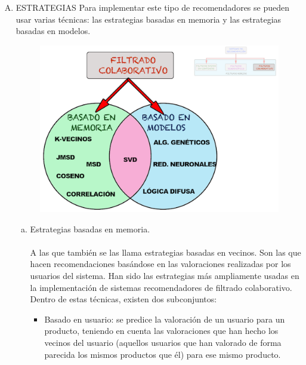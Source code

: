\documentclass[11pt,a4paper]{article}
\begin{document}
		 	\begin{enumerate}[A.]
		 		\item ESTRATEGIAS
		 		Para implementar este tipo de recomendadores se pueden usar varias técnicas: las estrategias basadas en memoria y las estrategias basadas en modelos. 
		 		
		 		\begin{figure}[H]
		 			\begin{center}
		 				\includegraphics[scale=0.9]{./Imagenes/img02}		
		 			\end{center}
		 		\end{figure}
	 			
	 			\begin{enumerate}[a.]
	 				\item Estrategias basadas en memoria.\\
	 				\\
	 				A las que también se las llama estrategias basadas en vecinos. Son las que hacen recomendaciones basándose en las valoraciones realizadas por los usuarios del sistema. Han sido las estrategias más ampliamente usadas en la implementación de sistemas recomendadores de filtrado colaborativo. Dentro de estas técnicas, existen dos subconjuntos: 
	 				
	 				\begin{itemize}
	 					\item Basado en usuario: se predice la valoración de un usuario para un producto, teniendo en cuenta las valoraciones que han hecho los vecinos del usuario (aquellos usuarios que han valorado de forma parecida los mismos productos que él) para ese mismo producto. \\


\end{itemize}
\end{enumerate}
\end{enumerate}
\end{document}
